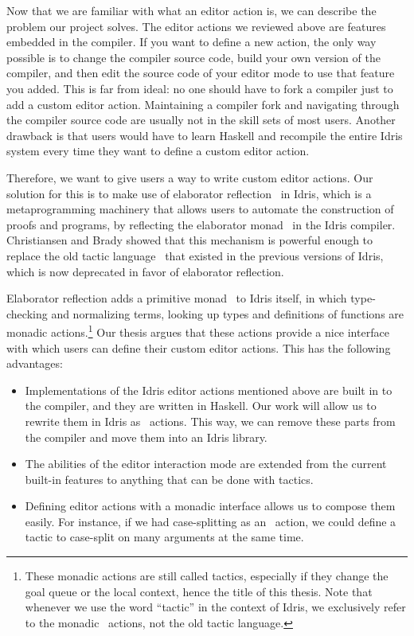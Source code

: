 Now that we are familiar with what an editor action is, we can describe the problem
our project solves. The editor actions we reviewed above are features embedded
in the compiler. If you want to define a new action, the only way possible is
to change the compiler source code, build your own version of the compiler,
and then edit the source code of your editor mode to use that feature you
added. This is far from ideal: no one should have to fork a compiler
just to add a custom editor action. Maintaining a compiler fork and
navigating through the compiler source code are usually not in the skill sets
of most users.
Another drawback is that users would have to learn Haskell and recompile the
entire Idris system every time they want to define a custom editor action.

Therefore, we want to give users a way to write custom editor actions. Our
solution for this is to make use of elaborator reflection~\cite{elabref} in
Idris, which is a metaprogramming machinery that allows users to automate the
construction of proofs and programs, by reflecting the elaborator
monad~\cite{idris} in the Idris compiler. Christiansen and Brady showed that
this mechanism is powerful enough to replace the old tactic
language~\cite{elabref} that existed in the previous versions of Idris, which is
now deprecated in favor of elaborator reflection.

Elaborator reflection adds a primitive monad \Elab\ to Idris itself, in which
type-checking and normalizing terms, looking up types and definitions of
functions are monadic actions.\footnote{These monadic actions are still called
tactics, especially if they change the goal queue or the local context, hence the
title of this thesis. Note that whenever we use the word ``tactic'' in the
context of Idris, we exclusively refer to the monadic \Elab\ actions, not the
old tactic language.}
Our thesis argues that these actions provide a nice interface with which users
can define their custom editor actions. This has the following advantages:

\begin{itemize}
\item Implementations of the Idris editor actions mentioned above are
built in to the compiler, and they are written in Haskell. Our work will allow
us to rewrite them in Idris as \Elab\ actions. This way, we can remove these
parts from the compiler and move them into an Idris library.
\item The abilities of the editor interaction mode are extended from the
current built-in features to anything that can be done with tactics.
\item Defining editor actions with a monadic interface allows us to
compose them easily. For instance, if we had case-splitting as an
\Elab\ action, we could define a tactic to case-split on many arguments at the
same time.
\end{itemize}

